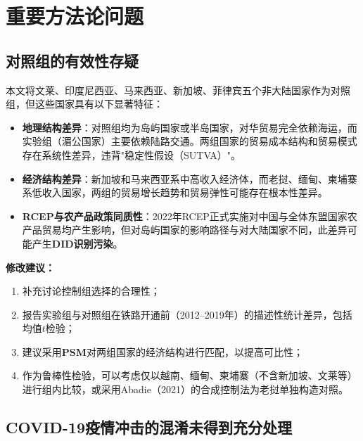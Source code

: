 \documentclass[12pt, a4paper]{article}
\begin{document}
\section{重要方法论问题}

\subsection{对照组的有效性存疑}
\label{sec:control_group}

\begin{majorbox}

本文将文莱、印度尼西亚、马来西亚、新加坡、菲律宾五个非大陆国家作为对照组，但这些国家具有以下显著特征：

\begin{itemize}
  \item \textbf{地理结构差异}：对照组均为岛屿国家或半岛国家，对华贸易完全依赖海运，而实验组（湄公国家）主要依赖陆路交通。两组国家的贸易成本结构和贸易模式存在系统性差异，违背"稳定性假设（SUTVA）"。
  \item \textbf{经济结构差异}：新加坡和马来西亚系中高收入经济体，而老挝、缅甸、柬埔寨系低收入国家，两组的贸易增长趋势和贸易弹性可能存在根本性差异。
  \item \textbf{RCEP与农产品政策同质性}：2022年RCEP正式实施对中国与全体东盟国家农产品贸易均产生影响，但对岛屿国家的影响路径与对大陆国家不同，此差异可能产生\textbf{DID识别污染}。
\end{itemize}

\textbf{修改建议：}
\begin{enumerate}[label=(\alph*)]
  \item 补充讨论控制组选择的合理性；
  \item 报告实验组与对照组在铁路开通前（2012--2019年）的描述性统计差异，包括均值$t$检验；
  \item 建议采用\textbf{PSM}对两组国家的经济结构进行匹配，以提高可比性；
  \item 作为鲁棒性检验，可以考虑仅以越南、缅甸、柬埔寨（不含新加坡、文莱等）进行组内比较，或采用Abadie（2021）的合成控制法为老挝单独构造对照。
\end{enumerate}
\end{majorbox}

\subsection{COVID-19疫情冲击的混淆未得到充分处理}
\label{sec:covid}
\end{document}
